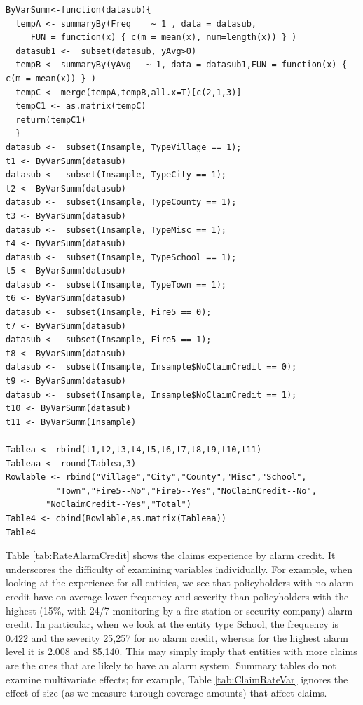 \documentclass[]{book}
\begin{document}
\hypertarget{display.ClaimRateVar.2}{}
\begin{verbatim}
ByVarSumm<-function(datasub){
  tempA <- summaryBy(Freq    ~ 1 , data = datasub,   
     FUN = function(x) { c(m = mean(x), num=length(x)) } )
  datasub1 <-  subset(datasub, yAvg>0)
  tempB <- summaryBy(yAvg   ~ 1, data = datasub1,FUN = function(x) { c(m = mean(x)) } )
  tempC <- merge(tempA,tempB,all.x=T)[c(2,1,3)]
  tempC1 <- as.matrix(tempC)
  return(tempC1)
  }
datasub <-  subset(Insample, TypeVillage == 1);   
t1 <- ByVarSumm(datasub)
datasub <-  subset(Insample, TypeCity == 1);      
t2 <- ByVarSumm(datasub)
datasub <-  subset(Insample, TypeCounty == 1);   
t3 <- ByVarSumm(datasub)
datasub <-  subset(Insample, TypeMisc == 1);      
t4 <- ByVarSumm(datasub)
datasub <-  subset(Insample, TypeSchool == 1);    
t5 <- ByVarSumm(datasub)
datasub <-  subset(Insample, TypeTown == 1);      
t6 <- ByVarSumm(datasub)
datasub <-  subset(Insample, Fire5 == 0);                      
t7 <- ByVarSumm(datasub)
datasub <-  subset(Insample, Fire5 == 1);                      
t8 <- ByVarSumm(datasub)
datasub <-  subset(Insample, Insample$NoClaimCredit == 0);
t9 <- ByVarSumm(datasub)
datasub <-  subset(Insample, Insample$NoClaimCredit == 1);
t10 <- ByVarSumm(datasub)
t11 <- ByVarSumm(Insample)

Tablea <- rbind(t1,t2,t3,t4,t5,t6,t7,t8,t9,t10,t11)
Tableaa <- round(Tablea,3)
Rowlable <- rbind("Village","City","County","Misc","School",
          "Town","Fire5--No","Fire5--Yes","NoClaimCredit--No",
        "NoClaimCredit--Yes","Total")
Table4 <- cbind(Rowlable,as.matrix(Tableaa))
Table4
\end{verbatim}

Table \ref{tab:RateAlarmCredit} shows the claims experience by alarm
credit. It underscores the difficulty of examining variables
individually. For example, when looking at the experience for all
entities, we see that policyholders with no alarm credit have on average
lower frequency and severity than policyholders with the highest (15\%,
with 24/7 monitoring by a fire station or security company) alarm
credit. In particular, when we look at the entity type School, the
frequency is 0.422 and the severity 25,257 for no alarm credit, whereas
for the highest alarm level it is 2.008 and 85,140. This may simply
imply that entities with more claims are the ones that are likely to
have an alarm system. Summary tables do not examine multivariate
effects; for example, Table \ref{tab:ClaimRateVar} ignores the effect of
size (as we measure through coverage amounts) that affect claims.
\end{document}
